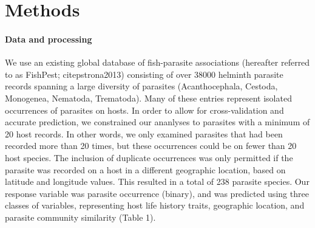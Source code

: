 \documentclass[12pt]{article}
\begin{document}
  




 
\section{Methods}
 \paragraph{Data and processing}
  We use an existing global database of fish-parasite associations (hereafter referred to as FishPest; citep{strona2013}) consisting of over 38000 helminth parasite records spanning a large diversity of parasites (Acanthocephala, Cestoda, Monogenea, Nematoda, Trematoda). Many of these entries represent isolated occurrences of parasites on hosts. In order to allow for cross-validation and accurate prediction, we constrained our ananlyses to parasites with a minimum of 20 host records. In other words, we only examined parasites that had been recorded more than 20 times, but these occurrences could be on fewer than 20 host species. The inclusion of duplicate occurrences was only permitted if the parasite was recorded on a host in a different geographic location, based on latitude and longitude values. This resulted in a total of 238 parasite species. Our response variable was parasite occurrence (binary), and was predicted using three classes of variables, representing host life history traits, geographic location, and parasite community similarity (Table 1). 
  
\end{document}
